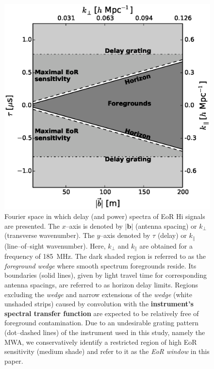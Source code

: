\documentclass[preprint2,iop,numberedappendix]{emulateapj}
\begin{document}
\begin{figure}[htb]
\centering
\includegraphics[width=\linewidth]{fig1.eps}
\caption{Fourier space in which delay (and power) spectra of EoR H{\sc i} signals are presented. The $x$--axis is denoted by $|\boldsymbol{b}|$ (antenna spacing) or $k_\perp$ (transverse wavenumber). The $y$--axis denoted by $\tau$ (delay) or $k_\parallel$ (line--of--sight wavenumber). Here, $k_\perp$ and $k_\parallel$ are obtained for a frequency of 185~MHz. The dark shaded region is referred to as the {\it foreground wedge} where smooth spectrum foregrounds reside. Its boundaries (solid lines), given by light travel time for corresponding antenna spacings, are referred to as horizon delay limits. Regions excluding the {\it wedge} and narrow extensions of the {\it wedge} (white unshaded strips) caused by convolution with the {\bf instrument's spectral transfer function} are expected to be relatively free of foreground contamination. Due to an undesirable grating pattern (dot--dashed lines) of the instrument used in this study, namely the MWA, we conservatively identify a restricted region of high EoR sensitivity (medium shade) and refer to it as the {\it EoR window} in this paper. \label{fig:fourier-space}}
\end{figure}
\end{document}
